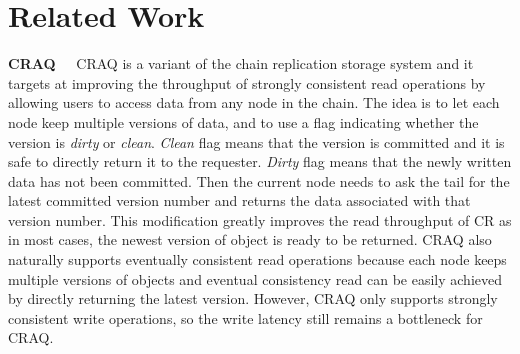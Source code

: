 \section{Related Work}


{\noindent \bf CRAQ\ \ } CRAQ\cite{terrace2009object} is a variant of the chain replication storage system and it targets at improving the throughput of strongly consistent read operations by allowing users to access data from any node in the chain. The idea is to let each node keep multiple versions of data, and to use a flag indicating whether the version is {\it dirty} or {\it clean}. {\it Clean} flag means that the version is committed and it is safe to directly return it to the requester. {\it Dirty} flag means that the newly written data has not been committed. Then the current node needs to ask the tail for the latest committed version number and returns the data associated with that version number. This modification greatly improves the read throughput of CR as in most cases, the newest version of object is ready to be returned. CRAQ also naturally supports eventually consistent read operations because each node keeps multiple versions of objects and eventual consistency read can be easily achieved by directly returning the latest version. However, CRAQ only supports strongly consistent write operations, so the write latency still remains a bottleneck for CRAQ. \\

